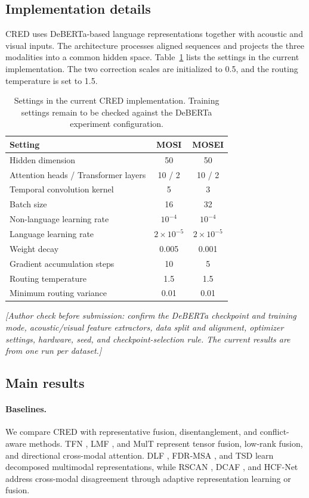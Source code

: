 \documentclass[review,12pt]{elsarticle}
\begin{document}
\subsection{Implementation details}
CRED uses DeBERTa-based language representations \cite{deberta} together with acoustic and visual inputs. The architecture processes aligned sequences and projects the three modalities into a common hidden space. Table~\ref{tab:config} lists the settings in the current implementation. The two correction scales are initialized to 0.5, and the routing temperature is set to 1.5.

\begin{table}[t]
\centering
\caption{Settings in the current CRED implementation. Training settings remain to be checked against the DeBERTa experiment configuration.}
\label{tab:config}
\small
\begin{tabular}{lcc}
\toprule
Setting & MOSI & MOSEI\\
\midrule
Hidden dimension & 50 & 50\\
Attention heads / Transformer layers & 10 / 2 & 10 / 2\\
Temporal convolution kernel & 5 & 3\\
Batch size & 16 & 32\\
Non-language learning rate & $10^{-4}$ & $10^{-4}$\\
Language learning rate & $2\times10^{-5}$ & $2\times10^{-5}$\\
Weight decay & 0.005 & 0.001\\
Gradient accumulation steps & 10 & 5\\
Routing temperature & 1.5 & 1.5\\
Minimum routing variance & 0.01 & 0.01\\
\bottomrule
\end{tabular}
\end{table}

\noindent\emph{[Author check before submission: confirm the DeBERTa checkpoint and training mode, acoustic/visual feature extractors, data split and alignment, optimizer settings, hardware, seed, and checkpoint-selection rule. The current results are from one run per dataset.]}

\subsection{Main results}
\paragraph{Baselines.}
We compare CRED with representative fusion, disentanglement, and conflict-aware methods. TFN \cite{tfn}, LMF \cite{lmf}, and MulT \cite{mult} represent tensor fusion, low-rank fusion, and directional cross-modal attention. DLF \cite{dlf}, FDR-MSA \cite{fdrmsa}, and TSD \cite{tsd} learn decomposed multimodal representations, while RSCAN \cite{rscan}, DCAF \cite{dcaf}, and HCF-Net \cite{hcfnet} address cross-modal disagreement through adaptive representation learning or fusion.
\end{document}
